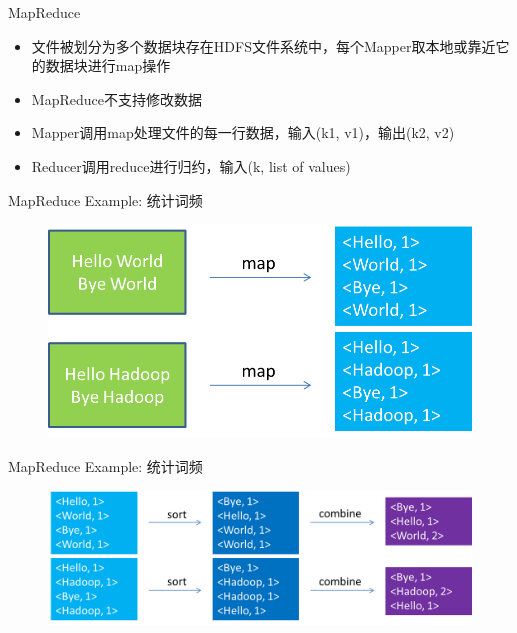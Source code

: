 \documentclass{beamer}
\begin{document}
\begin{frame}{MapReduce}

\begin{itemize}
\item 文件被划分为多个数据块存在HDFS文件系统中，每个Mapper取本地或靠近它的数据块进行map操作
\item MapReduce不支持修改数据
\item Mapper调用map处理文件的每一行数据，输入(k1, v1)，输出(k2, v2)
\item Reducer调用reduce进行归约，输入(k, list of values)
\end{itemize}

\end{frame}

\begin{frame}{MapReduce Example: 统计词频}

\begin{figure}
\includegraphics[width=\linewidth]{./WordCount_map}
\end{figure}

\end{frame}

\begin{frame}{MapReduce Example: 统计词频}

\begin{figure}
\includegraphics[width=\linewidth]{./WordCount_combine}
\end{figure}

\end{frame}
\end{document}
